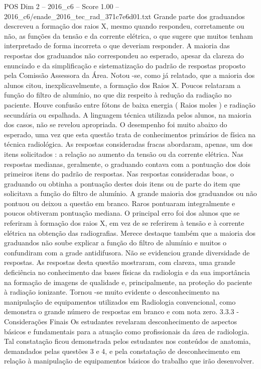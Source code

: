 \begin{textsample}{POS Dim 2 – 2016\_c6 – Score 1.00 – 2016\_c6/enade\_2016\_tec\_rad\_371c7e6d01.txt}
Grande parte dos graduandos descreveu a formação dos raios X, mesmo quando respondeu, corretamente ou não, as funções da tensão e da corrente elétrica, o que sugere que muitos tenham interpretado de forma incorreta o que deveriam responder.
A maioria das respostas dos graduandos não correspondeu ao esperado, apesar da clareza do enunciado e da simplificação e sistematização do padrão de respostas proposto pela Comissão Assessora da Área.
Notou -se, como já relatado, que a maioria dos alunos citou, inexplicavelmente, a formação dos Raios X.
Poucos relataram a função do filtro de alumínio, no que diz respeito à redução da radiação no paciente.
Houve confusão entre fótons de baixa energia ( Raios moles ) e radiação secundária ou espalhada.
A linguagem técnica utilizada pelos alunos, na maioria dos casos, não se revelou apropriada.
O desempenho foi muito abaixo do esperado, uma vez que esta questão trata de conhecimentos primários de física na técnica radiológica.
As respostas consideradas fracas abordaram, apenas, um dos itens solicitados : a relação ao aumento da tensão ou da corrente elétrica.
Nas respostas medianas, geralmente, o graduando contava com a pontuação dos dois primeiros itens do padrão de respostas.
Nas respostas consideradas boas, o graduando ou obtinha a pontuação destes dois itens ou de parte do item que solicitava a função do filtro de alumínio.
A grande maioria dos graduandos ou não pontuou ou deixou a questão em branco.
Raros pontuaram integralmente e poucos obtiveram pontuação mediana.
O principal erro foi dos alunos que se referiram à formação dos raios X, em vez de se referirem à tensão e à corrente elétrica na obtenção das radiografias.
Merece destaque também que a maioria dos graduandos não soube explicar a função do filtro de alumínio e muitos o confundiram com a grade antidifusora.
Não se evidenciou grande diversidade de respostas.
As respostas desta questão mostraram, com clareza, uma grande deficiência no conhecimento das bases físicas da radiologia e da sua importância na formação de imagens de qualidade e, principalmente, na proteção do paciente à radiação ionizante.
Tornou -se muito evidente o desconhecimento na manipulação de equipamentos utilizados em Radiologia convencional, como demonstra o grande número de respostas em branco e com nota zero. 3.3.3 - Considerações Finais Os estudantes revelaram desconhecimento de aspectos básicos e fundamentais para a atuação como profissionais da área de radiologia.
Tal constatação ficou demonstrada pelos estudantes nos conteúdos de anatomia, demandados pelas questões 3 e 4, e pela constatação de desconhecimento em relação à manipulação de equipamentos básicos do trabalho que irão desenvolver.

\end{textsample}

